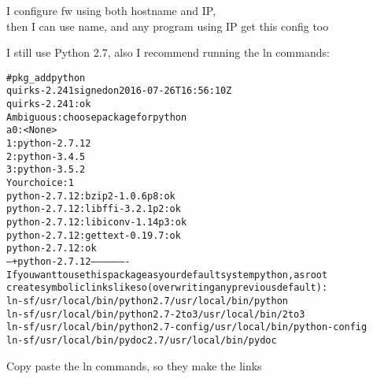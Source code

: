 \documentclass[18pt,landscape,a4paper,footrule]{foils}
\begin{document}
I configure fw using both hostname and IP,\\
then I can use name, and any program using IP get this config too



I still use Python 2.7, also I recommend running the ln commands:
\begin{alltt}\scriptsize
# pkg_add python
quirks-2.241 signed on 2016-07-26T16:56:10Z
quirks-2.241: ok
Ambiguous: choose package for python
a       0: <None>
        1: python-2.7.12
        2: python-3.4.5
        3: python-3.5.2
Your choice: 1
python-2.7.12:bzip2-1.0.6p8: ok
python-2.7.12:libffi-3.2.1p2: ok
python-2.7.12:libiconv-1.14p3: ok
python-2.7.12:gettext-0.19.7: ok
python-2.7.12: ok
--- +python-2.7.12 -------------------
If you want to use this package as your default system python, as root
create symbolic links like so (overwriting any previous default):
 ln -sf /usr/local/bin/python2.7 /usr/local/bin/python
 ln -sf /usr/local/bin/python2.7-2to3 /usr/local/bin/2to3
 ln -sf /usr/local/bin/python2.7-config /usr/local/bin/python-config
 ln -sf /usr/local/bin/pydoc2.7  /usr/local/bin/pydoc
\end{alltt}

Copy paste the ln commands, so they make the links
\end{document}
